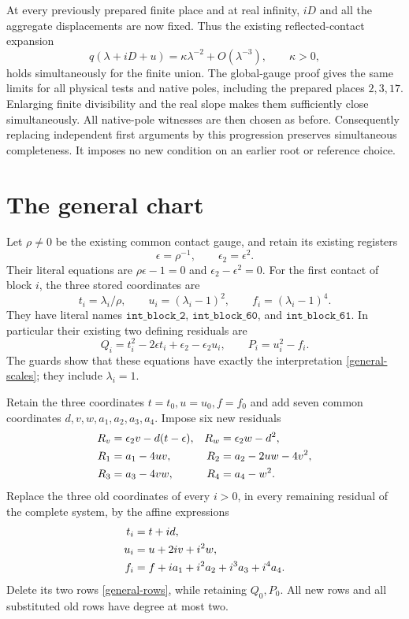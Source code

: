 \documentclass[11pt]{article}
\begin{document}
At every previously prepared finite place and at real infinity,
$iD$ and all the aggregate displacements are now fixed. Thus the
existing reflected-contact expansion
\[
 q(\lambda+iD+u)
       =\kappa\lambda^{-2}+O(\lambda^{-3}),\qquad \kappa>0,
\]
holds simultaneously for the finite union. The global-gauge proof gives
the same limits for all physical tests and native poles, including the
prepared places $2,3,17$. Enlarging finite divisibility and the real
slope makes them sufficiently close simultaneously. All native-pole
witnesses are then chosen as before. Consequently replacing independent
first arguments by this progression preserves simultaneous completeness.
It imposes no new condition on an earlier root or reference choice.

\section{The general chart}

Let $\rho\ne0$ be the existing common contact gauge, and retain its
existing registers
\[
             \epsilon=\rho^{-1},\qquad \epsilon_2=\epsilon^2.
\]
Their literal equations are
$\rho\epsilon-1=0$ and $\epsilon_2-\epsilon^2=0$.
For the first contact of block $i$, the three stored coordinates are
\begin{equation}\label{general-scales}
 t_i=\lambda_i/\rho,\qquad
 u_i=(\lambda_i-1)^2,\qquad f_i=(\lambda_i-1)^4.
\end{equation}
They have literal names
$\mathtt{int\_block\_2}$,
$\mathtt{int\_block\_60}$, and
$\mathtt{int\_block\_61}$.
In particular their existing two defining residuals are
\begin{equation}\label{general-rows}
 Q_i=t_i^2-2\epsilon t_i+\epsilon_2-\epsilon_2u_i,
 \qquad P_i=u_i^2-f_i.
\end{equation}
The guards show that these equations have exactly the interpretation
\eqref{general-scales}; they include $\lambda_i=1$.

Retain the three coordinates $t=t_0,u=u_0,f=f_0$ and add seven common
coordinates $d,v,w,a_1,a_2,a_3,a_4$. Impose six new residuals
\begin{align}
 R_v&=\epsilon_2v-d(t-\epsilon),&
 R_w&=\epsilon_2w-d^2,\label{general-mixed}\\
 R_1&=a_1-4uv,&R_2&=a_2-2uw-4v^2,\label{general-fourth}\\
 R_3&=a_3-4vw,&R_4&=a_4-w^2.\notag
\end{align}
Replace the three old coordinates of every $i>0$, in every remaining
residual of the complete system, by the affine expressions
\begin{align}
 t_i&=t+id,\label{affine}\\
 u_i&=u+2iv+i^2w,\notag\\
 f_i&=f+ia_1+i^2a_2+i^3a_3+i^4a_4.\notag
\end{align}
Delete its two rows \eqref{general-rows}, while retaining $Q_0,P_0$.
All new rows and all substituted old rows have degree at most two.
\end{document}
